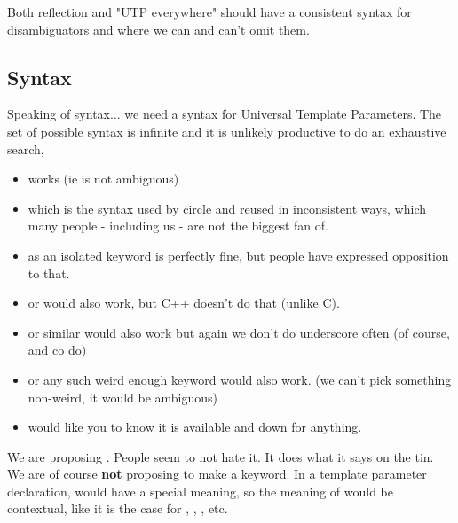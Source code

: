 \documentclass{wg21}
\begin{document}
Both reflection and "UTP everywhere" should have a consistent syntax for disambiguators and where we can and can't omit them.

\subsection{Syntax}

Speaking of syntax... we need a syntax for Universal Template Parameters.
The set of possible syntax is infinite and it is unlikely productive to do an exhaustive search,

\begin{itemize}

\item {} works (ie is not ambiguous)

\item {} which is the syntax used by circle and  reused  in inconsistent ways,
which many people - including us - are not the biggest fan of.

\item {} as an isolated keyword is perfectly fine, but people have expressed opposition to that.

\item {} or  would also work, but C++ doesn't do that (unlike C).

\item {} or similar would also work but again we don't do underscore often (of course,  and co do)

\item {} or any such weird enough keyword would also work. (we can't pick something non-weird, it would be ambiguous)

\item {} would like you to know it is available and down for anything.

\end{itemize}

We are proposing . People seem to not hate it. It does what it says on the tin.
We are of course \textbf{not} proposing to make  a keyword.
In a template parameter declaration,  would have a special meaning, so the meaning of  would be
contextual, like it is the case for , , , etc.
\end{document}
